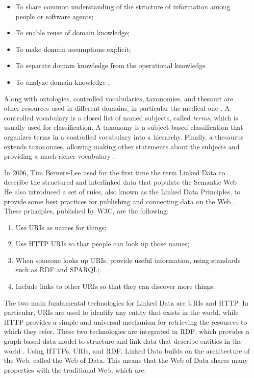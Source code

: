 \begin{itemize}
    \item To share common understanding of the structure of information among people or software agents;
    \item To enable reuse of domain knowledge;
    \item To make domain assumptions explicit;
    \item To separate domain knowledge from the operational knowledge
    \item To analyze domain knowledge \cite{noy2001ontology}.
\end{itemize}

Along with ontologies, controlled vocabularies, taxonomies, and thesauri are other resources used in different domains, in particular the medical one \cite{ivanovic2014overview}. A controlled vocabulary is a closed list of named subjects, called \textit{terms}, which is usually used for classification. A taxonomy is a subject-based classification that organizes terms in a controlled vocabulary into a hierarchy. Finally, a thesaurus extends taxonomies, allowing making other statements about the subjects and providing a much richer vocabulary \cite{ivanovic2014overview}.

In 2006, Tim Berners-Lee used for the first time the term Linked Data to describe the structured and interlinked data that populate the Semantic Web \cite{berners2006linked}. He also introduced a set of rules, also known as the Linked Data Principles, to provide some best practices for publishing and connecting data on the Web \cite{bizer2011linked}. These principles, published by \ac{W3C}, are the following:

\begin{enumerate}
    \item Use \acsp{URI} as names for things;
    \item Use \acs{HTTP} \acsp{URI} so that people can look up those names;
    \item When someone looks up \acsp{URI}, provide useful information, using standards such as \acs{RDF} and \acs{SPARQL};
    \item Include links to other \acsp{URI} so that they can discover more things.
\end{enumerate}

The two main fundamental technologies for Linked Data are \acp{URI} and \ac{HTTP}. In particular, \acp{URI} are used to identify any entity that exists in the world, while \ac{HTTP} provides a simple and universal mechanism for retrieving the resources to which they refer. These two technologies are integrated in \ac{RDF}, which provides a graph-based data model to structure and link data that describe entities in the world \cite{bizer2011linked}. Using \acp{HTTP}, \acp{URI}, and \ac{RDF}, Linked Data builds on the architecture of the Web, called the Web of Data. This means that the Web of Data shares many properties with the traditional Web, which are:

